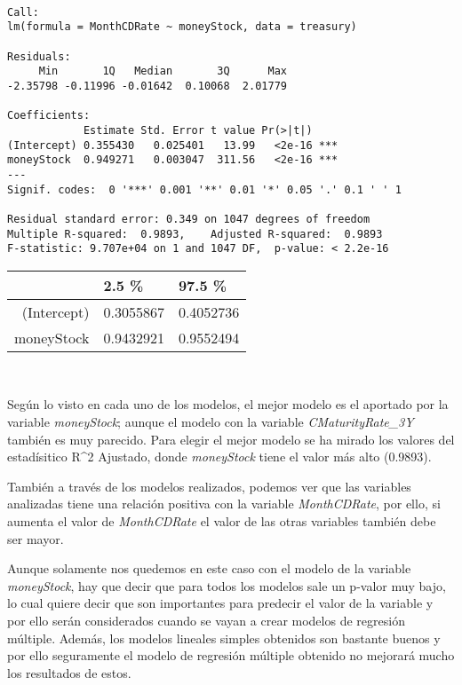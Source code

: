 \documentclass[11pt]{article}
\begin{document}
    
    \begin{verbatim}

Call:
lm(formula = MonthCDRate ~ moneyStock, data = treasury)

Residuals:
     Min       1Q   Median       3Q      Max 
-2.35798 -0.11996 -0.01642  0.10068  2.01779 

Coefficients:
            Estimate Std. Error t value Pr(>|t|)    
(Intercept) 0.355430   0.025401   13.99   <2e-16 ***
moneyStock  0.949271   0.003047  311.56   <2e-16 ***
---
Signif. codes:  0 '***' 0.001 '**' 0.01 '*' 0.05 '.' 0.1 ' ' 1

Residual standard error: 0.349 on 1047 degrees of freedom
Multiple R-squared:  0.9893,	Adjusted R-squared:  0.9893 
F-statistic: 9.707e+04 on 1 and 1047 DF,  p-value: < 2.2e-16

    \end{verbatim}

    
    \begin{tabular}{r|ll}
  & 2.5 \% & 97.5 \%\\
\hline
	(Intercept) & 0.3055867 & 0.4052736\\
	moneyStock & 0.9432921 & 0.9552494\\
\end{tabular}


    
    
    
    \begin{center}
    \end{center}
    { \hspace*{\fill} \\}
    
    Según lo visto en cada uno de los modelos, el mejor modelo es el
aportado por la variable \emph{moneyStock}; aunque el modelo con la
variable \emph{CMaturityRate\_3Y} también es muy parecido. Para elegir
el mejor modelo se ha mirado los valores del estadísitico R\^{}2
Ajustado, donde \emph{moneyStock} tiene el valor más alto (0.9893).

También a través de los modelos realizados, podemos ver que las
variables analizadas tiene una relación positiva con la variable
\emph{MonthCDRate}, por ello, si aumenta el valor de \emph{MonthCDRate}
el valor de las otras variables también debe ser mayor.

Aunque solamente nos quedemos en este caso con el modelo de la variable
\emph{moneyStock}, hay que decir que para todos los modelos sale un
p-valor muy bajo, lo cual quiere decir que son importantes para predecir
el valor de la variable y por ello serán considerados cuando se vayan a
crear modelos de regresión múltiple. Además, los modelos lineales
simples obtenidos son bastante buenos y por ello seguramente el modelo
de regresión múltiple obtenido no mejorará mucho los resultados de
estos.
\end{document}
